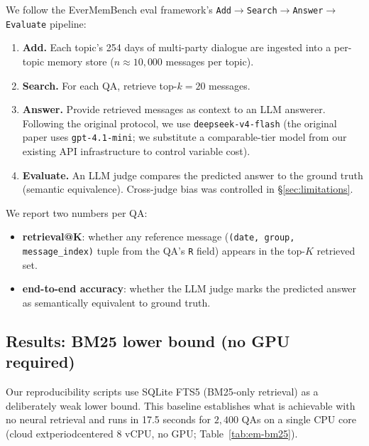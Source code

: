 We follow the EverMemBench eval framework's
\texttt{Add$\rightarrow$Search$\rightarrow$Answer$\rightarrow$Evaluate}
pipeline:

\begin{enumerate}
\item \textbf{Add.} Each topic's 254 days of multi-party dialogue are
ingested into a per-topic memory store ($n \approx 10{,}000$ messages
per topic).
\item \textbf{Search.} For each QA, retrieve top-\(k=20\) messages.
\item \textbf{Answer.} Provide retrieved messages as context to an LLM
answerer. Following the original protocol, we use
\texttt{deepseek-v4-flash} (the original paper uses \texttt{gpt-4.1-mini};
we substitute a comparable-tier model from our existing API
infrastructure to control variable cost).
\item \textbf{Evaluate.} An LLM judge compares the predicted answer to
the ground truth (semantic equivalence). Cross-judge bias was
controlled in §\ref{sec:limitations}.
\end{enumerate}

We report two numbers per QA:
\begin{itemize}
\item \textbf{retrieval@K}: whether any reference message
(\texttt{(date, group, message\_index)} tuple from the QA's
\texttt{R} field) appears in the top-\(K\) retrieved set.
\item \textbf{end-to-end accuracy}: whether the LLM judge marks the
predicted answer as semantically equivalent to ground truth.
\end{itemize}

\subsection{Results: BM25 lower bound (no GPU required)}

Our reproducibility scripts use SQLite FTS5 (BM25-only retrieval) as a
deliberately weak lower bound. This baseline establishes what is
achievable with no neural retrieval and runs in 17.5 seconds for
\(2{,}400\) QAs on a single CPU core (cloud 	extperiodcentered{}  8 vCPU,
no GPU; Table~\ref{tab:em-bm25}).

